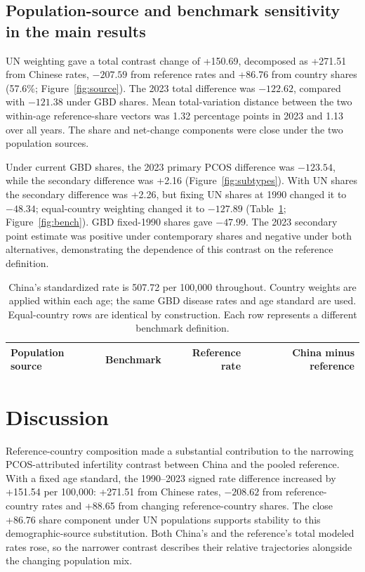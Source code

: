 \documentclass[11pt,a4paper]{article}
\begin{document}
\subsection{Population-source and benchmark sensitivity in the main results}
UN weighting gave a total contrast change of +150.69, decomposed as +271.51 from Chinese rates, $-207.59$ from reference rates and +86.76 from country shares (57.6\%; Figure~\ref{fig:source}). The 2023 total difference was $-122.62$, compared with $-121.38$ under GBD shares. Mean total-variation distance between the two within-age reference-share vectors was 1.32 percentage points in 2023 and 1.13 over all years. The share and net-change components were close under the two population sources.

Under current GBD shares, the 2023 primary PCOS difference was $-123.54$, while the secondary difference was +2.16 (Figure~\ref{fig:subtypes}). With UN shares the secondary difference was +2.26, but fixing UN shares at 1990 changed it to $-48.34$; equal-country weighting changed it to $-127.89$ (Table~\ref{tab:bench}; Figure~\ref{fig:bench}). GBD fixed-1990 shares gave $-47.99$. The 2023 secondary point estimate was positive under contemporary shares and negative under both alternatives, demonstrating the dependence of this contrast on the reference definition.

\begin{table}[htbp]\centering\small{}
\caption{Benchmark definition changes the 2023 PCOS secondary infertility contrast.}\label{tab:bench}
\begin{tabular}{llrr}\toprule
Population source & Benchmark & Reference rate & China minus reference\\\midrule
\end{tabular}
\caption*{China's standardized rate is 507.72 per 100,000 throughout. Country weights are applied within each age; the same GBD disease rates and age standard are used. Equal-country rows are identical by construction. Each row represents a different benchmark definition.}
\end{table}

\section{Discussion}
Reference-country composition made a substantial contribution to the narrowing PCOS-attributed infertility contrast between China and the pooled reference. With a fixed age standard, the 1990--2023 signed rate difference increased by +151.54 per 100,000: +271.51 from Chinese rates, $-208.62$ from reference-country rates and +88.65 from changing reference-country shares. The close +86.76 share component under UN populations supports stability to this demographic-source substitution. Both China's and the reference's total modeled rates rose, so the narrower contrast describes their relative trajectories alongside the changing population mix.
\end{document}
